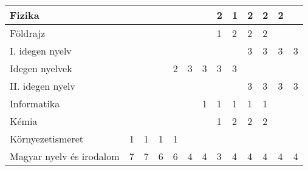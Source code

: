 \begin{landscape}
\begin{table}[]
\begin{tabular}{l|l|l|l|l|l|l|l|l|l|l|l|l}
    Fizika                                              &                                       &             &             &             &             &             & 2           & 1           & 2           & 2           & 2           &             \\ \hline
    Földrajz                                            &                                       &             &             &             &             &             & 1           & 2           & 2           & 2           &             &             \\ \hline
    I. idegen nyelv                                     &                                       &             &             &             &             &             &             &             & 3           & 3           & 3           & 3           \\ \hline
    Idegen nyelvek                                      &                                       &             &             & 2           & 3           & 3           & 3           & 3           &             &             &             &             \\ \hline
    II. idegen nyelv                                    &                                       &             &             &             &             &             &             &             & 3           & 3           & 3           & 3           \\ \hline
    Informatika                                         &                                       &             &             &             &             & 1           & 1           & 1           & 1           & 1           &             &             \\ \hline
    Kémia                                               &                                       &             &             &             &             &             & 1           & 2           & 2           & 2           &             &             \\ \hline
    Környezetismeret                                    & 1                                     & 1           & 1           & 1           &             &             &             &             &             &             &             &             \\ \hline
    Magyar nyelv és irodalom                            & 7                                     & 7           & 6           & 6           & 4           & 4           & 3           & 4           & 4           & 4           & 4           & 4           \\ \hline

\end{tabular}
\end{table}
\end{landscape}
